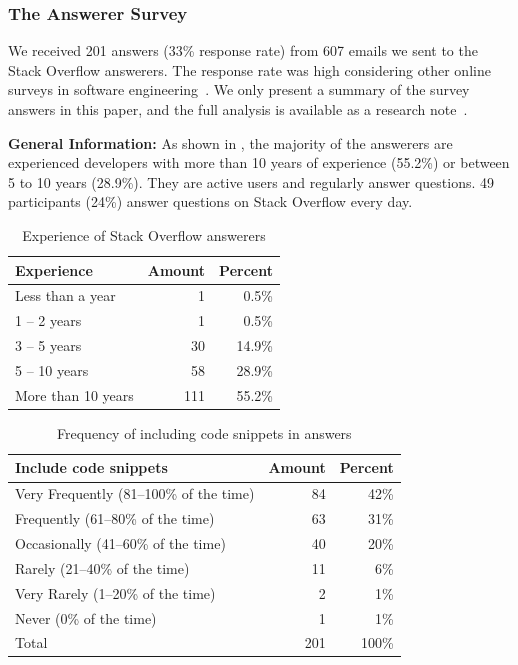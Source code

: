 \documentclass[10pt,journal,compsoc]{IEEEtran}
\begin{document}
\subsubsection{The Answerer Survey}

We received 201 answers (33\% response rate) from 607 emails we sent to the
Stack Overflow answerers. The response rate was high considering other
online surveys in software engineering~\cite{Punter2003}. 
We only present a summary of the survey answers in
this paper, and the full analysis is available as a research note~\cite{Ragkhitwetsagul_RN2017}.

\textbf{General Information:} As shown in , the majority of the answerers are experienced
developers with more than 10 years of experience (55.2\%) or between 5 to 10
years (28.9\%). They are active users and regularly answer questions. 49
participants (24\%) answer questions on Stack Overflow every day.

\begin{table}
	\centering
	\caption{Experience of Stack Overflow answerers}
	\label{tab:survey_exp}
	\begin{tabular}{lrr}
		\toprule
		Experience & Amount & Percent \\
		\midrule
		Less than a year & 1 & 0.5\% \\
		1 -- 2 years & 1 & 0.5\% \\
		3 -- 5 years & 30 & 14.9\% \\
		5 -- 10 years & 58 & 28.9\% \\
		More than 10 years	& 111 & 55.2\% \\
		\bottomrule
	\end{tabular}
\end{table}

\begin{table}
	\centering
	\caption{Frequency of including code snippets in answers}
	\label{tab:survey_code_snippet_frequency}
	\begin{tabular}{lrr}
		\toprule
		Include code snippets & Amount & Percent \\
		\midrule
		Very Frequently (81--100\% of the time)	& 84 & 42\% \\
		Frequently (61--80\% of the time) &	63 & 31\% \\
		Occasionally (41--60\% of the time) & 40 & 20\% \\
		Rarely (21--40\% of the time) & 11 & 6\% \\
		Very Rarely (1--20\% of the time) & 2 & 1\% \\
		Never (0\% of the time) & 1 & 1\% \\
		\midrule
		Total & 201 & 100\% \\
		\bottomrule
	\end{tabular}
\end{table}
\end{document}
